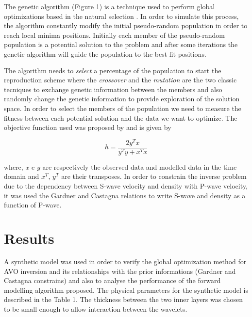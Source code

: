 \documentclass{vie16}
\begin{document}
The genetic algorithm (Figure 1) is a technique used to perform global optimizations based in the natural selection \cite{Holland1975}. In order to simulate this process, the algorithm constantly modify the initial pseudo-random population in order to reach local minima positions. Initially each member of the pseudo-random population is a potential solution to the problem and after some iterations the genetic algorithm will guide the population to the best fit positions. 

The algorithm needs to \textit{select} a percentage of the population to start the reproduction scheme where the \textit{crossover} and the \textit{mutation} are the two classic tecniques to exchange genetic information between the members and also randomly change the genetic information to provide exploration of the solution space. In order to select the members of the population we need to measure the fitness between each potential solution and the data we want to optimize. The objective function used was proposed by \cite{Porsani2000} and is given by

\begin{equation}
h = \frac{2y^{T} x} {y^{T}y + x^{T}x} \label{eq.Porsani}
\end{equation} 

where, $x$ e $y$ are respectively the observed data and modelled data in the time domain and  $x^{T}$, $y^{T}$ are their transposes. In order to constrain the inverse problem due to the dependency between S-wave velocity and density with P-wave velocity, it was used the Gardner \citep{Gardner01121974} and Castagna \citep{Castagna01041985} relations to write S-wave and density as a function of P-wave. 

\section{Results}
A synthetic model was used in order to verify the global optimization method for AVO inversion and its relationships with the prior informations (Gardner and Castagna constrains) and also to analyse the performance of the forward modelling algorithm proposed. The physical parameters for the synthetic model is described in the Table 1. The thickness between the two inner layers was chosen to be small enough to allow interaction between the wavelets. 
\end{document}
